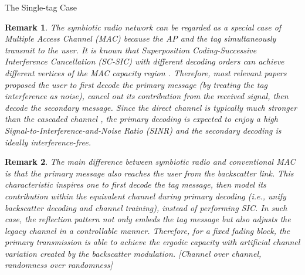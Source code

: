\documentclass[journal]{IEEEtran}
\newtheorem{remark}{Remark}
\begin{document}
\begin{section}{The Single-tag Case}
		\begin{remark}
			The symbiotic radio network can be regarded as a special case of Multiple Access Channel (MAC) because the AP and the tag simultaneously transmit to the user. It is known that Superposition Coding-Successive Interference Cancellation (SC-SIC) with different decoding orders can achieve different vertices of the MAC capacity region \cite{Goldsmith2005}. Therefore, most relevant papers proposed the user to first decode the primary message (by treating the tag interference as noise), cancel out its contribution from the received signal, then decode the secondary message. Since the direct channel is typically much stronger than the cascaded channel \cite{Ozdogan2020}, the primary decoding is expected to enjoy a high Signal-to-Interference-and-Noise Ratio (SINR) and the secondary decoding is ideally interference-free.
		\end{remark}

		\begin{remark}
			The main difference between symbiotic radio and conventional MAC is that the primary message also reaches the user from the backscatter link. This characteristic inspires one to first decode the tag message, then model its contribution within the equivalent channel during primary decoding (i.e., unify backscatter decoding and channel training), instead of performing SIC. In such case, the reflection pattern not only embeds the tag message but also adjusts the legacy channel in a controllable manner. Therefore, for a fixed fading block, the primary transmission is able to achieve the ergodic capacity with artificial channel variation created by the backscatter modulation. [Channel over channel, randomness over randomness]
		\end{remark}


\end{section}
\end{document}
